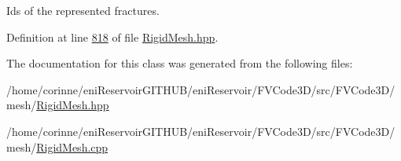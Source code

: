Ids of the represented fractures. 



Definition at line \hyperlink{RigidMesh_8hpp_source_l00818}{818} of file \hyperlink{RigidMesh_8hpp_source}{Rigid\+Mesh.\+hpp}.



The documentation for this class was generated from the following files\+:\begin{DoxyCompactItemize}
\item 
/home/corinne/eni\+Reservoir\+G\+I\+T\+H\+U\+B/eni\+Reservoir/\+F\+V\+Code3\+D/src/\+F\+V\+Code3\+D/mesh/\hyperlink{RigidMesh_8hpp}{Rigid\+Mesh.\+hpp}\item 
/home/corinne/eni\+Reservoir\+G\+I\+T\+H\+U\+B/eni\+Reservoir/\+F\+V\+Code3\+D/src/\+F\+V\+Code3\+D/mesh/\hyperlink{RigidMesh_8cpp}{Rigid\+Mesh.\+cpp}\end{DoxyCompactItemize}
